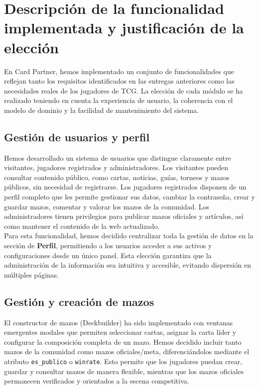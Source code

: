 \documentclass[10pt]{article}
\begin{document}
	\section{Descripción de la funcionalidad implementada y justificación de la elección}
		En Card Partner, hemos implementado un conjunto de funcionalidades que reflejan tanto los requisitos identificados en las entregas anteriores como las necesidades reales de los jugadores de TCG. La elección de cada módulo se ha realizado teniendo en cuenta la experiencia de usuario, la coherencia con el modelo de dominio y la facilidad de mantenimiento del sistema.

		\subsection{Gestión de usuarios y perfil}
			Hemos desarrollado un sistema de usuarios que distingue claramente entre visitantes, jugadores registrados y administradores. Los visitantes pueden consultar contenido público, como cartas, noticias, guías, torneos y mazos públicos, sin necesidad de registrarse. Los jugadores registrados disponen de un perfil completo que les permite gestionar sus datos, cambiar la contraseña, crear y guardar mazos, comentar y valorar los mazos de la comunidad. Los administradores tienen privilegios para publicar mazos oficiales y artículos, así como mantener el contenido de la web actualizado.\\

			Para esta funcionalidad, hemos decidido centralizar toda la gestión de datos en la sección de \textbf{Perfil}, permitiendo a los usuarios acceder a sus activos y configuraciones desde un único panel. Esta elección garantiza que la administración de la información sea intuitiva y accesible, evitando dispersión en múltiples páginas.

		\subsection{Gestión y creación de mazos}
			El constructor de mazos (Deckbuilder) ha sido implementado con ventanas emergentes modales que permiten seleccionar cartas, asignar la carta líder y configurar la composición completa de un mazo. Hemos decidido incluir tanto mazos de la comunidad como mazos oficiales/meta, diferenciándolos mediante el atributo \texttt{es\_publico} o \texttt{winrate}. Esto permite que los jugadores puedan crear, guardar y consultar mazos de manera flexible, mientras que los mazos oficiales permanecen verificados y orientados a la escena competitiva.\\
\end{document}
